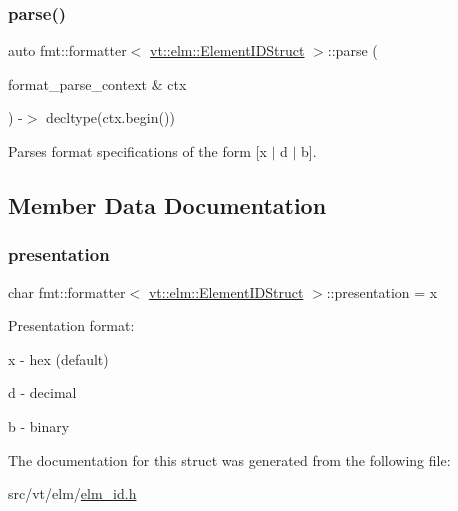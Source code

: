 \subsubsection{\texorpdfstring{parse()}{parse()}}
{\footnotesize\ttfamily auto fmt\+::formatter$<$ \hyperlink{structvt_1_1elm_1_1_element_i_d_struct}{vt\+::elm\+::\+Element\+I\+D\+Struct} $>$\+::parse (\begin{DoxyParamCaption}\item[{format\+\_\+parse\+\_\+context \&}]{ctx }\end{DoxyParamCaption}) -\/$>$ decltype(ctx.\+begin()) \hspace{0.3cm}{\ttfamily [inline]}}



Parses format specifications of the form \mbox{[}\textquotesingle{}x\textquotesingle{} $\vert$ \textquotesingle{}d\textquotesingle{} $\vert$ \textquotesingle{}b\textquotesingle{}\mbox{]}. 



\subsection{Member Data Documentation}
\mbox{\label{structfmt_1_1formatter_3_01vt_1_1elm_1_1_element_i_d_struct_01_4_a6979043e4d0ca6f3e88da60c5848d8b1}} 
\subsubsection{\texorpdfstring{presentation}{presentation}}
{\footnotesize\ttfamily char fmt\+::formatter$<$ \hyperlink{structvt_1_1elm_1_1_element_i_d_struct}{vt\+::elm\+::\+Element\+I\+D\+Struct} $>$\+::presentation = \textquotesingle{}x\textquotesingle{}}

Presentation format\+:
\begin{DoxyItemize}
\item \textquotesingle{}x\textquotesingle{} -\/ hex (default)
\item \textquotesingle{}d\textquotesingle{} -\/ decimal
\item \textquotesingle{}b\textquotesingle{} -\/ binary 
\end{DoxyItemize}

The documentation for this struct was generated from the following file\+:\begin{DoxyCompactItemize}
\item 
src/vt/elm/\hyperlink{elm__id_8h}{elm\+\_\+id.\+h}\end{DoxyCompactItemize}
